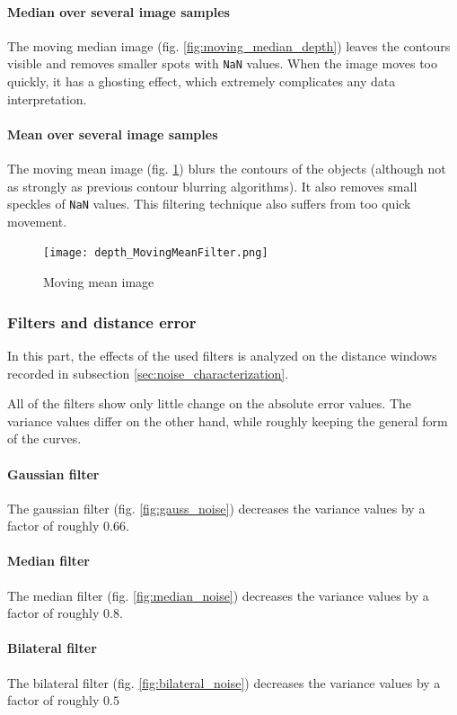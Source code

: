 \documentclass[DIV12,a4paper]{scrartcl}
\begin{document}
\paragraph{Median over several image samples}
The moving median image (fig. \ref{fig:moving_median_depth}) leaves the contours visible and removes smaller spots with \texttt{NaN} values. When the image moves too quickly, it has a ghosting effect, which extremely complicates any data interpretation.
\paragraph{Mean over several image samples}
The moving mean image (fig. \ref{fig:moving_mean_depth}) blurs the contours of the objects (although not as strongly as previous contour blurring algorithms). It also removes small speckles of \texttt{NaN} values. This filtering technique also suffers from too quick movement.
\begin{figure}[h!tbp]
  \centering
  \texttt{[image: depth\_MovingMeanFilter.png]}
  \caption{Moving mean image}
  \label{fig:moving_mean_depth}
\end{figure}

\newpage
\subsubsection{Filters and distance error}
\label{sec:filters_distance_error}
In this part, the effects of the used filters is analyzed on the distance windows recorded in subsection \ref{sec:noise_characterization}. 
\par
All of the filters show only little change on the absolute error values. The variance values differ on the other hand, while roughly keeping the general form of the curves.

\paragraph{Gaussian filter} The gaussian filter (fig. \ref{fig:gauss_noise}) decreases the variance values by a factor of roughly $0.66$.
\paragraph{Median filter} The median filter (fig. \ref{fig:median_noise}) decreases the variance values by a factor of roughly $0.8$.

\paragraph{Bilateral filter} The bilateral filter (fig. \ref{fig:bilateral_noise}) decreases the variance values by a factor of roughly $0.5$
\end{document}
